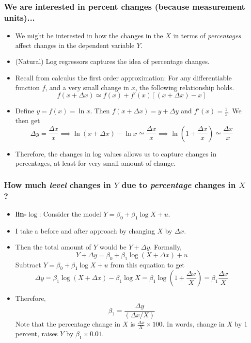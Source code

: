 \documentclass[aspectratio=169]{beamer}
\begin{document}
\begin{frame}
\frametitle{We are interested in percent changes (because measurement units)...}
\begin{itemize}
\item We might be interested in how the changes in the $X$ in terms of \textit{percentages} affect changes in the dependent variable $Y$. 
\item (Natural) Log regressors captures the idea of percentage changes. 
\item Recall from calculus the first order approximation: For any differentiable function $f$, and a very small change in $x$, the following relationship holds. 
\[
f(x+\Delta x) \simeq f(x)+f'(x)[(x+\Delta x) -x] 
\]
\item Define $y=f(x)=\ln{x}$. Then $f(x+\Delta x) = y+\Delta y$ and $f'(x)=\frac{1}{x}$. We then get 
\[
\Delta y = \frac{\Delta x}{x}\implies \ln{(x+\Delta x)}-\ln{x} \simeq \frac{\Delta x}{x} \implies \ln\left(1+\frac{\Delta x}{x}\right)\simeq\frac{\Delta x}{x}
\]
\item Therefore, the changes in log values allows us to capture changes in percentages, at least for very small amount of change.
\end{itemize}
\end{frame}

\begin{frame}
\frametitle{How much \textit{level} changes in $Y$ due to \textit{percentage} changes in $X$?}
\begin{itemize}
\item\textbf{lin-$\log$}:  Consider the model $Y=\beta_0 + \beta_1 \log{X}+u$.
\item I take a before and after approach by changing $X$ by $\Delta x$. 
\item Then the total amount of $Y$ would be $Y+\Delta y$. Formally, 
\[
Y+\Delta y = \beta_0 + \beta_1 \log(X+\Delta x)+u
\]
Subtract $Y=\beta_0 + \beta_1 \log{X}+u$ from this equation to get
\[
\Delta y = \beta_1 \log(X+\Delta x)-\beta_1\log{X} = \beta_1 \log\left(1+\frac{\Delta x}{X} \right) = \beta_1 \frac{\Delta x}{X}
\]
\item Therefore, 
\[
\beta_1 = \frac{\Delta y}{(\Delta x/X)}
\]
Note that the percentage change in $X$ is $\frac{\Delta x}{X} \times 100$. In words, change in $X$ by 1 percent, raises $Y$ by $\beta_1 \times 0.01$. 
\end{itemize}
\end{frame}
\end{document}
